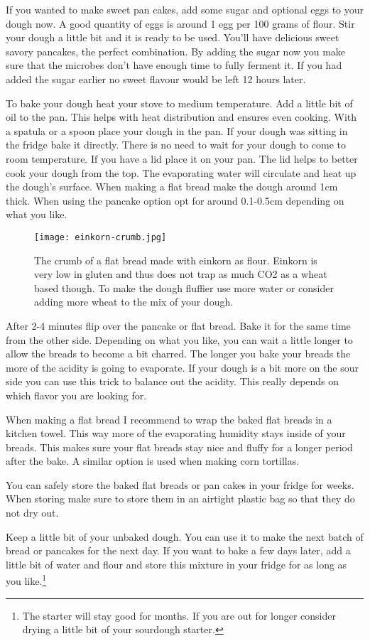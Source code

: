 If you wanted to make sweet pan cakes, add some sugar and optional eggs to your dough
now. A good quantity of eggs is around 1 egg per 100 grams of flour.
Stir your dough a little bit and it is ready to be used. You'll 
have delicious sweet savory pancakes, the perfect combination. By
adding the sugar now you make sure that the microbes don't have
enough time to fully ferment it. If you had added the sugar
earlier no sweet flavour would be left 12 hours later.

To bake your dough heat your stove to medium temperature. Add a little bit of
oil to the pan. This helps with heat distribution and ensures even cooking.
With a spatula or a spoon place your dough in the pan. If your dough
was sitting in the fridge bake it directly. There is no need to wait for your
dough to come to room temperature. If you have a lid
place it on your pan. The lid helps to better cook your dough from the top.
The evaporating water will circulate and heat up the dough's surface. When
making a flat bread make the dough around 1cm thick. When using the pancake
option opt for around 0.1-0.5cm depending on what you like.

\begin{figure}[htb!]
  \texttt{[image: einkorn-crumb.jpg]}
  \centering
  \caption{The crumb of a flat bread made with einkorn as flour. Einkorn
  is very low in gluten and thus does not trap as much CO2 as a wheat based
  though. To make the dough fluffier use more water or consider adding
  more wheat to the mix of your dough.}
\end{figure}

After 2-4 minutes flip over the pancake or flat bread. Bake it for the same
time from the other side. Depending on what you like, you can wait a little
longer to allow the breads to become a bit charred.  The longer you
bake your breads the more of the acidity is going to evaporate. If your
dough is a bit more on the sour side you can use this trick to balance
out the acidity. This really depends on which flavor you are looking for.

When making a flat bread I recommend to wrap the baked flat breads
in a kitchen towel. This way more of the evaporating humidity
stays inside of your breads. This makes sure your flat breads stay
nice and fluffy for a longer period after the bake. A similar option is
used when making corn tortillas.

You can safely store the baked flat breads or pan cakes in your fridge
for weeks. When storing make sure to store them in an airtight plastic bag so that
they do not dry out.

Keep a little bit of your unbaked dough. You can use it to make the next
batch of bread or pancakes for the next day. If you want to bake a few days later, add
a little bit of water and flour and store this mixture in your fridge
for as long as you like.\footnote{The starter will stay good for months. If you are out
for longer consider drying a little bit of your sourdough starter.}